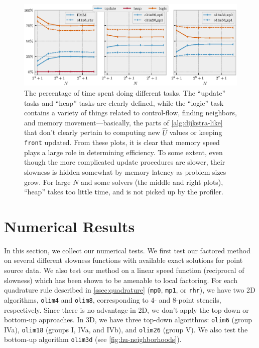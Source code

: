 \documentclass[sisc-eikonal.tex]{subfiles}
\begin{document}
\begin{figure}
  \includegraphics[width=\linewidth]{tasks.eps}%
  \vspace{-0.5em}
  \caption{ The percentage of time spent doing different tasks. The
    ``update'' tasks and ``heap'' tasks are clearly defined, while the
    ``logic'' task contains a variety of things related to
    control-flow, finding neighbors, and memory movement---basically,
    the parts of \cref{alg:dijkstra-like} that don't clearly pertain
    to computing new $\hat{U}$ values or keeping \texttt{front}
    updated. From these plots, it is clear that memory speed plays a
    large role in determining efficiency. To some extent, even though
    the more complicated update procedures are slower, their slowness
    is hidden somewhat by memory latency as problem sizes grow. For
    large $N$ and some solvers (the middle and right plots), ``heap''
    takes too little time, and is not picked up by the
    profiler.}\label{fig:tasks}
\end{figure}

\section{Numerical Results}\label{sec:numerical-results} In this
section, we collect our numerical tests. We first test our factored
method on several different slowness functions with available exact
solutions for point source data. We also test our method on a linear
speed function (reciprocal of slowness) which has been shown to be
amenable to local factoring. For each quadrature rule described in
\cref{ssec:quadrature} (\texttt{mp0}, \texttt{mp1}, or \texttt{rhr}),
we have two 2D algorithms, \texttt{olim4} and \texttt{olim8},
corresponding to 4- and 8-point stencils, respectively. Since there is
no advantage in 2D, we don't apply the top-down or bottom-up
approaches. In 3D, we have three top-down algorithms: \texttt{olim6}
(group IVa), \texttt{olim18} (groups I, IVa, and IVb), and
\texttt{olim26} (group V). We also test the bottom-up algorithm
\texttt{olim3d} (see \cref{fig:hu-neighborhoods}).
\end{document}
